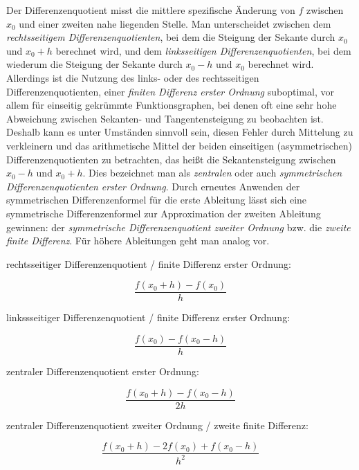 \documentclass{scrartcl}
\begin{document}
Der Differenzenquotient misst die mittlere spezifische Änderung von $f$ zwischen $x_0$ und einer zweiten nahe liegenden Stelle. Man unterscheidet zwischen dem \textit{rechtsseitigem Differenzenquotienten}, bei dem die Steigung der Sekante durch $x_0$ und $x_0 + h$ berechnet wird, und dem \textit{linksseitigen Differenzenquotienten}, bei dem wiederum die Steigung der Sekante durch $x_0 - h$ und $x_0$ berechnet wird. Allerdings ist die Nutzung des links- oder des rechtsseitigen Differenzenquotienten, einer \textit{finiten Differenz erster Ordnung} suboptimal, vor allem für einseitig gekrümmte Funktionsgraphen, bei denen oft eine sehr hohe Abweichung zwischen Sekanten- und Tangentensteigung zu beobachten ist. Deshalb kann es unter Umständen sinnvoll sein, diesen Fehler durch Mittelung zu verkleinern und das arithmetische Mittel der beiden einseitigen (asymmetrischen) Differenzenquotienten zu betrachten, das heißt die Sekantensteigung zwischen $x_0 - h$ und $x_0 + h$. Dies bezeichnet man als \textit{zentralen} oder auch \textit{symmetrischen Differenzenquotienten erster Ordnung}. Durch erneutes Anwenden der symmetrischen Differenzenformel für die erste Ableitung lässt sich eine symmetrische Differenzenformel zur Approximation der zweiten Ableitung gewinnen: der \textit{symmetrische Differenzenquotient zweiter Ordnung} bzw. die \textit{zweite finite Differenz}. Für höhere Ableitungen geht man analog vor.\cite{westermann}
\begin{shaded}
\begin{center}
 rechtsseitiger Differenzenquotient / finite Differenz erster Ordnung:
 \end{center} \[ \frac {f(x_0 + h) - f(x_0)}{h} \]
\begin{center}
 linkssseitiger Differenzenquotient / finite Differenz erster Ordnung:
 \end{center} \[ \frac {f(x_0) - f(x_0 - h)}{h} \]
\begin{center}
 zentraler Differenzenquotient erster Ordnung:
 \end{center} \[ \frac {f(x_0 + h) - f(x_0-h)}{2h} \]
\begin{center}
 zentraler Differenzenquotient zweiter Ordnung / zweite finite Differenz:
 \end{center} \[ \frac{f(x_0+h) - 2f(x_0)+f(x_0-h)}{h^2} \]
\end{shaded}
\end{document}

